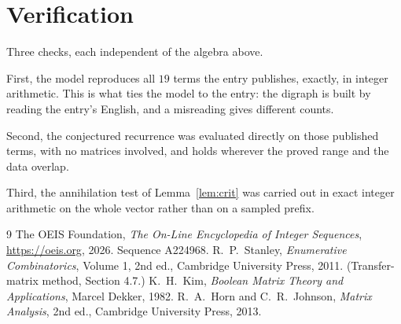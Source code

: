 \documentclass[11pt,a4paper]{article}
\theoremstyle{plain}
\theoremstyle{definition}
\begin{document}
\section{Verification}

Three checks, each independent of the algebra above.

First, the model reproduces all $19$ terms the entry publishes, exactly, in integer
arithmetic. This is what ties the model to the entry: the digraph is built by reading the
entry's English, and a misreading gives different counts.

Second, the conjectured recurrence was evaluated directly on those published terms, with no
matrices involved, and holds wherever the proved range and the data overlap.

Third, the annihilation test of Lemma~\ref{lem:crit} was carried out in exact integer
arithmetic on the whole vector rather than on a sampled prefix.

\begin{thebibliography}{9}
 The OEIS Foundation, \emph{The On-Line Encyclopedia of Integer
Sequences}, \url{https://oeis.org}, 2026. Sequence A224968.
 R.~P.~Stanley, \emph{Enumerative Combinatorics}, Volume 1, 2nd ed.,
Cambridge University Press, 2011. (Transfer-matrix method, Section 4.7.)
 K.~H.~Kim, \emph{Boolean Matrix Theory and Applications}, Marcel Dekker,
1982.
 R.~A.~Horn and C.~R.~Johnson, \emph{Matrix Analysis}, 2nd ed., Cambridge
University Press, 2013.
\end{thebibliography}
\end{document}
